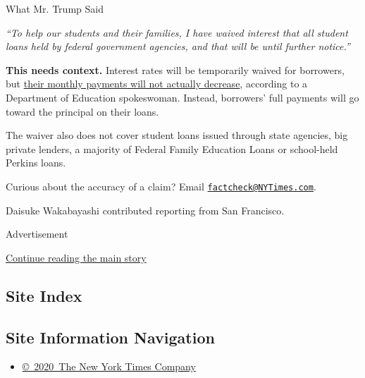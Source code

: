 What Mr. Trump Said

\emph{``To help our students and their families, I have waived interest
that all student loans held by federal government agencies, and that
will be until further notice.''}

\textbf{This needs context.} Interest rates will be temporarily waived
for borrowers, but
\href{https://www.nytimes3xbfgragh.onion/2020/03/13/business/live-stock-market.html\#link-6b9e26b3}{their
monthly payments will not actually decrease}, according to a Department
of Education spokeswoman. Instead, borrowers' full payments will go
toward the principal on their loans.

The waiver also does not cover student loans issued through state
agencies, big private lenders, a majority of Federal Family Education
Loans or school-held Perkins loans.

Curious about the accuracy of a claim? Email
\href{mailto:factcheck@NYTimes.com}{\nolinkurl{factcheck@NYTimes.com}}.

Daisuke Wakabayashi contributed reporting from San Francisco.

Advertisement

\protect\hyperlink{after-bottom}{Continue reading the main story}

\hypertarget{site-index}{%
\subsection{Site Index}\label{site-index}}

\hypertarget{site-information-navigation}{%
\subsection{Site Information
Navigation}\label{site-information-navigation}}

\begin{itemize}
\tightlist
\item
  \href{https://help.nytimes3xbfgragh.onion/hc/en-us/articles/115014792127-Copyright-notice}{©~2020~The
  New York Times Company}
\end{itemize}

